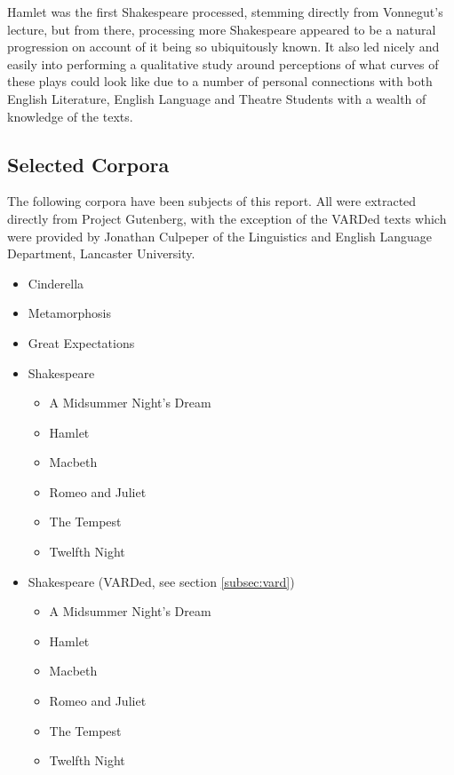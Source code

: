 \documentclass{article}
\begin{document}
{    Hamlet was the first Shakespeare processed, stemming directly from Vonnegut's lecture, but from there, processing more Shakespeare appeared to be a natural progression on account of it being so ubiquitously known. It also led nicely and easily into performing a qualitative study around perceptions of what curves of these plays could look like due to a number of personal connections with both English Literature, English Language and Theatre Students with a wealth of knowledge of the texts.
    
    \subsection{Selected Corpora}
    The following corpora have been subjects of this report. All were extracted directly from Project Gutenberg, with the exception of the VARDed texts which were provided by Jonathan Culpeper of the Linguistics and English Language Department, Lancaster University.
        \begin{itemize}
            \item Cinderella
            \item Metamorphosis
            \item Great Expectations
            \item Shakespeare
            \begin{itemize}
                \item A Midsummer Night's Dream
                \item Hamlet
                \item Macbeth
                \item Romeo and Juliet
                \item The Tempest
                \item Twelfth Night
            \end{itemize}
            \item Shakespeare (VARDed, see section \ref{subsec:vard})
            \begin{itemize}
                \item A Midsummer Night's Dream
                \item Hamlet
                \item Macbeth
                \item Romeo and Juliet
                \item The Tempest
                \item Twelfth Night
            \end{itemize}
        \end{itemize}
}
\end{document}
